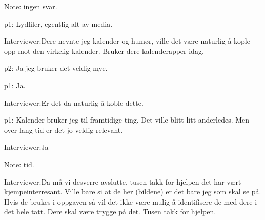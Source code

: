 \documentclass[11pt, norsk, a4paper]{article}
\begin{document}
\textcolor{myGrey}{Note:} ingen svar.

\textcolor{myGreen} {p1:} Lydfiler, egentlig alt av media.

\textcolor{myBlue} {Interviewer:}Dere nevnte jeg kalender og humør, ville det være naturlig å kople opp mot den virkelig kalender. Bruker dere kalenderapper idag.

\textcolor{myYellow} {p2:} Ja jeg bruker det veldig mye.

\textcolor{myGreen} {p1:} Ja.

\textcolor{myBlue} {Interviewer:}Er det da naturlig å koble dette.

\textcolor{myGreen} {p1:} Kalender bruker jeg til framtidige ting. Det ville blitt litt anderledes. Men over lang tid er det jo veldig relevant. 

\textcolor{myBlue} {Interviewer:}Ja

\textcolor{myGrey}{Note:} tid.

\textcolor{myBlue} {Interviewer:}Da må vi desverre avslutte, tusen takk for hjelpen det har vært kjempeinterresant. Ville bare si at de her (bildene) er det bare jeg som skal se på. Hvis de brukes i oppgaven så vil det ikke være mulig å identifisere de med dere i det hele tatt. Dere skal være trygge på det. Tusen takk for hjelpen. 
\end{document}
